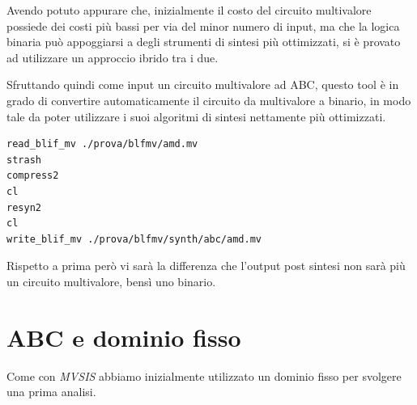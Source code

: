 \documentclass[italian,]{book}
\begin{document}
Avendo potuto appurare che, inizialmente il costo del circuito multivalore possiede dei costi più bassi per via del minor numero di input, ma che la logica binaria può appoggiarsi a degli strumenti di sintesi più ottimizzati, si è provato ad utilizzare un approccio ibrido tra i due.

Sfruttando quindi come input un circuito multivalore ad ABC, questo tool è in grado di convertire automaticamente il circuito da multivalore a binario, in modo tale da poter utilizzare i suoi algoritmi di sintesi nettamente più ottimizzati.

\begin{verbatim}
read_blif_mv ./prova/blfmv/amd.mv
strash
compress2
cl
resyn2
cl
write_blif_mv ./prova/blfmv/synth/abc/amd.mv
\end{verbatim}

Rispetto a prima però vi sarà la differenza che l'output post sintesi non sarà più un circuito multivalore, bensì uno binario.

\newpage

\hypertarget{abc-e-dominio-fisso}{%
\section{ABC e dominio fisso}\label{abc-e-dominio-fisso}}

Come con \emph{MVSIS} abbiamo inizialmente utilizzato un dominio fisso per svolgere una prima analisi.
\end{document}

